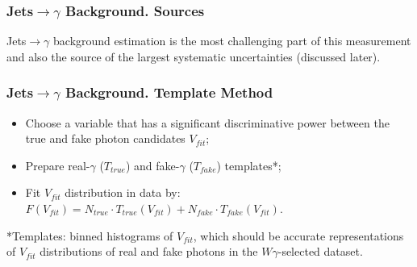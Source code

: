 \begin{frame}\frametitle{Jets$\rightarrow \gamma$ Background. Sources}
  \scriptsize
  Jets$\rightarrow \gamma$ background estimation is the most challenging part of this measurement and also the source of the largest systematic uncertainties (discussed later).
\end{frame}

\begin{frame}\frametitle{Jets$\rightarrow \gamma$ Background. Template Method}
  \scriptsize
  \begin{itemize}
    \item Choose a variable that has a significant discriminative power between the true and fake photon candidates $V_{fit}$;
    \item Prepare real-$\gamma$ ($T_{true}$) and fake-$\gamma$ ($T_{fake}$) templates*;
    \item Fit $V_{fit}$ distribution in data by: $F(V_{fit})=N_{true} \cdot T_{true}(V_{fit}) + N_{fake} \cdot T_{fake}(V_{fit})$.
  \end{itemize}
\scriptsize
*Templates: binned histograms of $V_{fit}$, which should be accurate representations of $V_{fit}$ distributions of real and fake photons in the $W\gamma$-selected dataset.
\end{frame}

